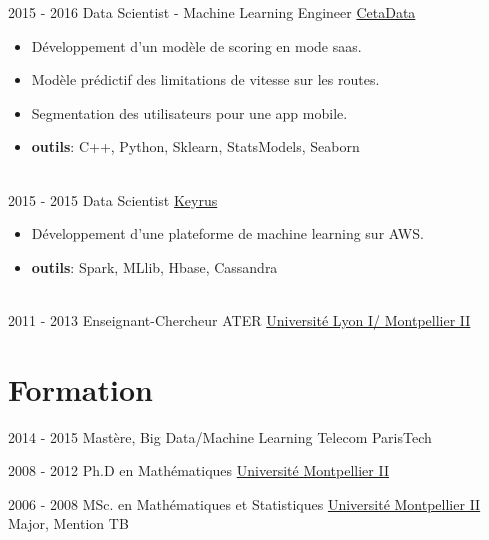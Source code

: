 \documentclass[letterpaper]{twentysecondcvfr} %
\begin{document}
\begin{twenty}
    \twentyitem
   		{2015 - 2016}
		{}
        {Data Scientist - Machine Learning Engineer}
        {\href{http://www.cetadata.com/}{CetaData}}
        {}
        {\begin{itemize}
				\item D\'eveloppement d'un mod\`ele de scoring en mode saas.
        \item Mod\`ele pr\'edictif des limitations de vitesse sur les routes.
				\item Segmentation des utilisateurs pour une app mobile.
				\item \textbf{outils}: C++, Python, Sklearn, StatsModels, Seaborn
    \end{itemize}} \\
		
     \twentyitem
   		{2015 - 2015}
		{}
        {Data Scientist}
        {\href{http://www.keyrus.com/}{Keyrus}}
        {}
        {
        \begin{itemize}
        \item D\'eveloppement d'une plateforme de machine learning sur AWS. 
				\item \textbf{outils}: Spark, MLlib, Hbase, Cassandra
    \end{itemize} }\\
		
	\twentyitem
   		{2011 - 2013}
		{}
        {Enseignant-Chercheur ATER}
        {\href{http://www.univ-lyon1.fr/}{Universit\'e Lyon I/ Montpellier II}}
        {}
        {}
        
\end{twenty}





\vspace{-0.5cm}
\section{Formation}{\faGraduationCap}

\begin{twenty} %
	\twentyitemshorttest
    	{2014 - 2015}
        {}
        {Mast\`ere, Big Data/Machine Learning}
        {Telecom ParisTech}{}
				
	\twentyitemshorttest
    	{2008 - 2012}
		{}
        {Ph.D en Math\'ematiques}
        {\href{http://www.umontpellier.fr/}{Universit\'e Montpellier II}}
        {}
				
	\twentyitemshorttest
    	{2006 - 2008}
		{}
        {MSc. en Math\'ematiques et Statistiques}
        {\href{http://www.umontpellier.fr/}{Universit\'e Montpellier II}}
        {Major, Mention TB}
\end{twenty}
\end{document}
